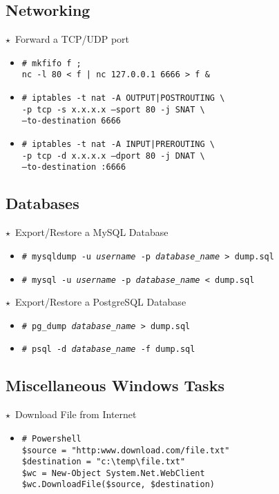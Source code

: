 \documentclass[10pt,landscape]{article}
\newcommand{\os}[1]{\texttt{\footnotesize{#1}}}
\newcommand{\unix}{\os{U}}
\newcommand{\linux}{\os{L}}
\newcommand{\windows}{\os{W}}
\newenvironment{action}[1]
  {\begin{minipage}[c]{\linewidth}$\star$~#1\begin{itemize}[leftmargin=1cm]}
  {\end{itemize}\end{minipage}\vspace*{3pt}}
\newcommand{\cmd}[2]{\item[#1] {\small\tt\# #2}}
\begin{document}
\begin{multicols*}{3}
\subsection*{Networking}

\begin{action}{Forward a TCP/UDP port}
\cmd{\unix}{mkfifo f ;\\
nc -l 80 < f | nc 127.0.0.1 6666 > f \&}
\cmd{\linux}{iptables -t nat -A OUTPUT|POSTROUTING \textbackslash\\
  -p tcp -s x.x.x.x --sport 80 -j SNAT \textbackslash\\
  --to-destination 6666}
\cmd{\linux}{iptables -t nat -A INPUT|PREROUTING \textbackslash\\
  -p tcp -d x.x.x.x --dport 80 -j DNAT \textbackslash\\
  --to-destination :6666}
\end{action}

\subsection*{Databases}

\begin{action}{Export/Restore a MySQL Database}
\cmd{\unix}{mysqldump -u \emph{username} -p \emph{database\_name} > dump.sql}
\cmd{\unix}{mysql -u \emph{username} -p \emph{database\_name} < dump.sql}
\end{action}
\begin{action}{Export/Restore a PostgreSQL Database}
\cmd{\unix}{pg\_dump \emph{database\_name} > dump.sql}
\cmd{\unix}{psql -d \emph{database\_name} -f dump.sql}
\end{action}

\subsection*{Miscellaneous Windows Tasks}

\begin{action}{Download File from Internet}
\cmd{\windows}{ 
Powershell \\
\$source = "http:www.download.com/file.txt" \\
\$destination = "c:\textbackslash temp\textbackslash file.txt" \\
\$wc = New-Object System.Net.WebClient \\
\$wc.DownloadFile(\$source, \$destination)}
\end{action}
  

\end{multicols*}
\end{document}
